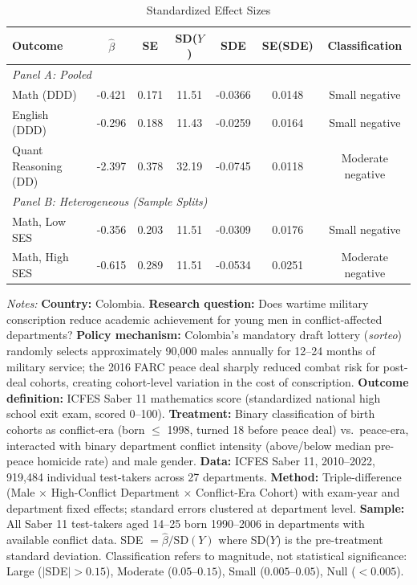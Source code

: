 \begin{table}[htbp]
\centering
\caption{Standardized Effect Sizes}
\label{tab:sde}
\begin{tabular}{lcccccc}
\hline\hline
Outcome & $\hat{\beta}$ & SE & SD($Y$) & SDE & SE(SDE) & Classification \\
\hline
\multicolumn{7}{l}{\textit{Panel A: Pooled}} \\[3pt]
Math (DDD) & -0.421 & 0.171 & 11.51 & -0.0366 & 0.0148 & Small negative \\
English (DDD) & -0.296 & 0.188 & 11.43 & -0.0259 & 0.0164 & Small negative \\
Quant Reasoning (DD) & -2.397 & 0.378 & 32.19 & -0.0745 & 0.0118 & Moderate negative \\
\hline
\multicolumn{7}{l}{\textit{Panel B: Heterogeneous (Sample Splits)}} \\[3pt]
Math, Low SES & -0.356 & 0.203 & 11.51 & -0.0309 & 0.0176 & Small negative \\
Math, High SES & -0.615 & 0.289 & 11.51 & -0.0534 & 0.0251 & Moderate negative \\
\hline\hline
\end{tabular}
\begin{flushleft}\footnotesize
\textit{Notes:} \textbf{Country:} Colombia. \textbf{Research question:} Does wartime military conscription reduce academic achievement for young men in conflict-affected departments? \textbf{Policy mechanism:} Colombia's mandatory draft lottery (\textit{sorteo}) randomly selects approximately 90,000 males annually for 12--24 months of military service; the 2016 FARC peace deal sharply reduced combat risk for post-deal cohorts, creating cohort-level variation in the cost of conscription. \textbf{Outcome definition:} ICFES Saber 11 mathematics score (standardized national high school exit exam, scored 0--100). \textbf{Treatment:} Binary classification of birth cohorts as conflict-era (born $\leq$ 1998, turned 18 before peace deal) vs.~peace-era, interacted with binary department conflict intensity (above/below median pre-peace homicide rate) and male gender. \textbf{Data:} ICFES Saber 11, 2010--2022, 919,484 individual test-takers across 27 departments. \textbf{Method:} Triple-difference (Male $\times$ High-Conflict Department $\times$ Conflict-Era Cohort) with exam-year and department fixed effects; standard errors clustered at department level. \textbf{Sample:} All Saber 11 test-takers aged 14--25 born 1990--2006 in departments with available conflict data. SDE $= \hat{\beta} / \text{SD}(Y)$ where SD($Y$) is the pre-treatment standard deviation. Classification refers to magnitude, not statistical significance: Large ($|$SDE$| > 0.15$), Moderate ($0.05$--$0.15$), Small ($0.005$--$0.05$), Null ($< 0.005$).
\end{flushleft}
\end{table}
